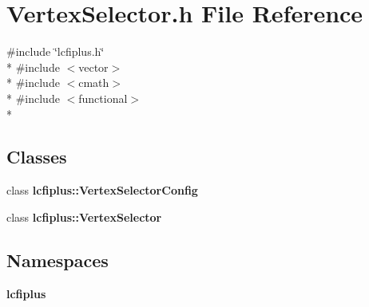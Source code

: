 \section{Vertex\-Selector.\-h File Reference}
\label{VertexSelector_8h}
{\ttfamily \#include \char`\"{}lcfiplus.\-h\char`\"{}}\\*
{\ttfamily \#include $<$vector$>$}\\*
{\ttfamily \#include $<$cmath$>$}\\*
{\ttfamily \#include $<$functional$>$}\\*
\subsection*{Classes}
\begin{DoxyCompactItemize}
\item 
class {\bf lcfiplus\-::\-Vertex\-Selector\-Config}
\item 
class {\bf lcfiplus\-::\-Vertex\-Selector}
\end{DoxyCompactItemize}
\subsection*{Namespaces}
\begin{DoxyCompactItemize}
\item 
{\bf lcfiplus}
\end{DoxyCompactItemize}
